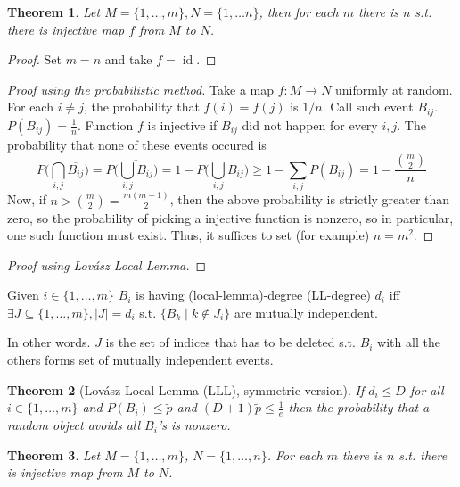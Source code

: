 \documentclass{article}
\theoremstyle{plain}
\newtheorem{thm}{Theorem}[section]
\theoremstyle{definition}
\begin{document}
\begin{thm}
	Let $M=\{1,\ldots,m\},N=\{1,\ldots n\}$, then for each $m$ there is $n$ s.t. there is injective map $f$ from $M$ to $N$.
\end{thm}
\begin{proof}
	Set $m=n$ and take $f=\operatorname{id}$.
\end{proof}
\begin{proof}[Proof using the probabilistic method]
	Take a map $f:M\rightarrow {N}$ uniformly at random. For each $i\neq j$, the probability that $f(i)=f(j)$ is $1/n$. Call such event $B_{ij}$. $P(B_{ij})=\frac{1}{n}$. Function $f$ is injective if $B_{ij}$ did not happen for every $i,j$. The probability that none of these events occured is $$P\bigg(\bigcap_{i,j}\overline{B_{ij}}\bigg)=P\bigg(\overline{\bigcup_{i,j}B_{ij}}\bigg)=1-P\bigg(\bigcup_{i,j}B_{ij}\bigg)\geq 1-\sum_{i,j}P(B_{ij})=1-\frac{{m\choose 2}}{n}$$ Now, if $n > {m\choose 2}=\frac{m(m-1)}{2}$, then the above probability is strictly greater than zero, so the probability of picking a injective function is nonzero, so in particular, one such function must exist. Thus, it suffices to set (for example) $n = m^2$.
\end{proof}

\begin{proof}[Proof using Lovász Local Lemma]
	
\end{proof}








 Given $i\in\{1,\ldots, m\}$ $B_i$ is having (local-lemma)-degree (LL-degree) $d_i$ iff $\exists J\subseteq \{1,\ldots, m\}, |J|=d_i$ s.t. $\{B_k \mid k \notin J_i\}$ are mutually independent.

In other words. $J$ is the set of indices that has to be deleted s.t. $B_i$ with all the others forms set of mutually independent events.


\begin{thm}[Lovász Local Lemma (LLL), symmetric version]
	If $d_i \leq D$ for all $i\in\{1,\ldots,m\}$ and $P(B_i) \leq \tilde{p}$ and $(D+1)\tilde{p}\leq\frac{1}{e}$ then the probability that a random object avoids all $B_i$'s is nonzero.
\end{thm}


\begin{thm}
	Let $M=\{1,\ldots, m\}$, $N=\{1,\ldots, n\}$. For each $m$ there is $n$ s.t. there is injective map from $M$ to $N$.
\end{thm}
\end{document}
